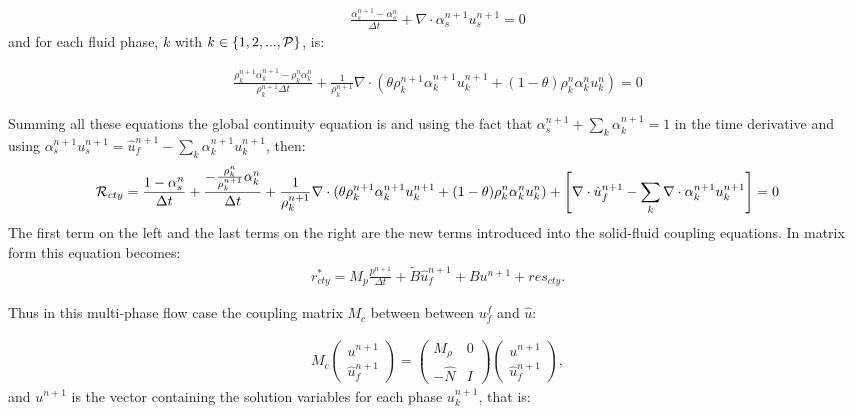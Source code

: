 \begin{eqnarray}
\frac{ \alpha_s^{n+1} -\alpha_s^n}{\Delta t} + \nabla\cdot \alpha_s^{n+1} u_s^{n+1} =0
\end{eqnarray} 
and for each fluid phase, $k$ with $ k\in\{1,2,...,{\cal P}\}$, is: 


\begin{eqnarray}
\frac{ \rho_k^{n+1} \alpha_k^{n+1} -\rho_k^{n}\alpha_k^n}{ \rho_k^{n+1}\Delta t} 
+ \frac{1}{\rho_k^{n+1} } \nabla\cdot (\theta \rho_k^{n+1} \alpha_k^{n+1} u_k^{n+1}+(1-\theta) \rho_k^{n} \alpha_k^{n} u_k^{n}) =0
\end{eqnarray} 

Summing all these equations the global continuity equation is and using the fact that $ \alpha_s^{n+1}+\sum_k\alpha_k^{n+1}=1$ in the time 
derivative and using $\alpha_s^{n+1} u_s^{n+1}=\hat u_f^{n+1} - \sum_k\alpha_k^{n+1} u_k^{n+1}$, then: 
\begin{eqnarray}
{\cal{R}}_{cty} =\frac{1-\alpha_s^n}{\Delta t} + 
\frac{  - \frac{\rho_k^{n}}{\rho_k^{n+1}}\alpha_k^n}{ \Delta t} 
+ \frac{1}{\rho_k^{n+1} } \nabla\cdot (\theta \rho_k^{n+1} \alpha_k^{n+1} u_k^{n+1}+(1-\theta) \rho_k^{n} \alpha_k^{n} u_k^{n}) 
+\left[ \nabla\cdot\hat u_f^{n+1} - \sum_k \nabla\cdot \alpha_k^{n+1} u_k^{n+1} \right]
=0
\end{eqnarray} 
The first term on the left and the last terms on the right are the new terms introduced into the solid-fluid coupling equations. 
In matrix form this equation becomes: 
\begin{eqnarray}
{r}_{cty}^* =M_p \frac{p^{n+1}}{\Delta t} + \tilde B \hat u_f^{n+1} + B u^{n+1} + res_{cty} . 
\end{eqnarray} 

Thus in this multi-phase flow case the coupling matrix $M_c$ between between $u_f^f$ and $\hat u$: 

\begin{eqnarray}
M_c 
\begin{pmatrix}
u^{n+1} \\ \hat u_f^{n+1}
\end{pmatrix}  
=
\begin{pmatrix}
M_\rho  & 0 \\ 
-\hat N  & I 
\end{pmatrix} 
\begin{pmatrix}
u^{n+1} \\ \hat u_f^{n+1} 
\end{pmatrix}  , 
\end{eqnarray}
and $u^{n+1}$ is the vector containing the solution variables for each phase $u_k^{n+1}$, that is: 

